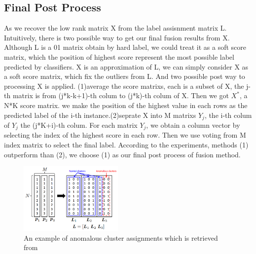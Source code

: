 \documentclass[letterpaper]{article}
\def\bL{{\bf L}}
\def\yanred{\textcolor{red}}
\begin{document}
\subsection{Final Post Process}
As we recover the low rank matrix X from the label assisnment matrix L. Intuitively, there is two possible way to get our final fusion results from X. Although L is a 01 matrix obtain by hard label, we could treat it as a soft score matrix, which the position of highest score represent the most possible label predicted by classifiers. X is an approximation of L, we can simply consider X as a soft score matrix, which fix the outliers from L. And two possible post way to processing X is applied.
(1)average the score matrixs, each is a subset of X, the j-th matrix is from (j*k-k+1)-th colum to (j*k)-th colum of X. Then we got $X^*$, a N*K score matrix. we make the position of the highest value in each rows as the predicted label of the i-th instance.(2)seprate X into M matrixs $Y_j$, the i-th colum of $Y_j$ the (j*K+i)-th colum. For each matrix $Y_j$, we obtain a column vector by selecting the index of the highest score in each row. Then we use voting from M index matrix to select the final label.
According to the experiments, methods (1) outperform than (2), we choose (1) as our final post process of fusion method.

\begin{figure}
  \centering
  \includegraphics[width=0.45\textwidth]{resource/anomalous_clusters.png}
  \caption{An example of anomalous cluster assignments which is retrieved from~\cite{gaoijcai2016robust}}\label{fig:anomalous_cluster}
\end{figure}
\end{document}
